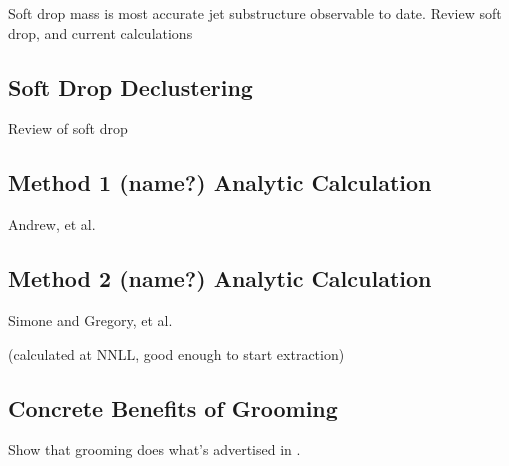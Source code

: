 
Soft drop mass is most accurate jet substructure observable to date.  Review soft drop, and current calculations

\subsection{Soft Drop Declustering}

Review of soft drop

\subsection{Method 1 (name?) Analytic Calculation}

Andrew, et al.

\subsection{Method 2 (name?)  Analytic Calculation}

Simone and Gregory, et al.

(calculated at NNLL, good enough to start extraction)

\subsection{Concrete Benefits of Grooming}

Show that grooming does what's advertised in .